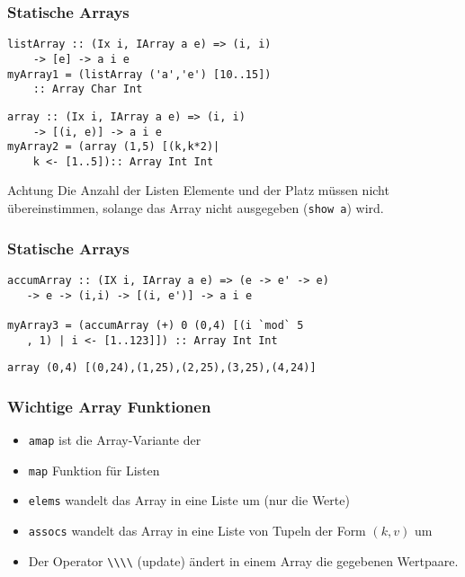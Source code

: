 \documentclass[fleqn,11pt,aspectratio=43]{beamer}
\begin{document}
\begin{frame}[fragile]
\frametitle{Statische Arrays}
\begin{lstlisting}
listArray :: (Ix i, IArray a e) => (i, i) 
    -> [e] -> a i e
myArray1 = (listArray ('a','e') [10..15]) 
    :: Array Char Int
\end{lstlisting}	
\pause
\begin{lstlisting}
array :: (Ix i, IArray a e) => (i, i) 
    -> [(i, e)] -> a i e
myArray2 = (array (1,5) [(k,k*2)| 
    k <- [1..5]):: Array Int Int
\end{lstlisting}
\begin{alertblock}{Achtung}
Die Anzahl der Listen Elemente und der Platz müssen nicht übereinstimmen, solange das Array nicht ausgegeben (\lstinline|show a|) wird. 
\end{alertblock}
\end{frame}

\begin{frame}[fragile]
\frametitle{Statische Arrays}
\begin{lstlisting}
accumArray :: (IX i, IArray a e) => (e -> e' -> e) 
   -> e -> (i,i) -> [(i, e')] -> a i e

myArray3 = (accumArray (+) 0 (0,4) [(i `mod` 5
   , 1) | i <- [1..123]]) :: Array Int Int
\end{lstlisting}	
\pause
\begin{block}{\vspace*{-3ex}}
\lstinline|array (0,4) [(0,24),(1,25),(2,25),(3,25),(4,24)]|
\end{block}
\end{frame}

\begin{frame}
\frametitle{Wichtige Array Funktionen}
\begin{block}{\vspace*{-3ex}}
\begin{itemize}
\item \lstinline|amap| ist die Array-Variante der \item \lstinline|map| Funktion für Listen
\item \lstinline|elems| wandelt das Array in eine Liste um (nur die Werte)
\item \lstinline|assocs| wandelt das Array in eine Liste von Tupeln der Form $(k, v)$ um
\item Der Operator \lstinline|\\\\| (update) ändert in einem Array die gegebenen Wertpaare.
\end{itemize}
\end{block}
\end{frame}
\end{document}

